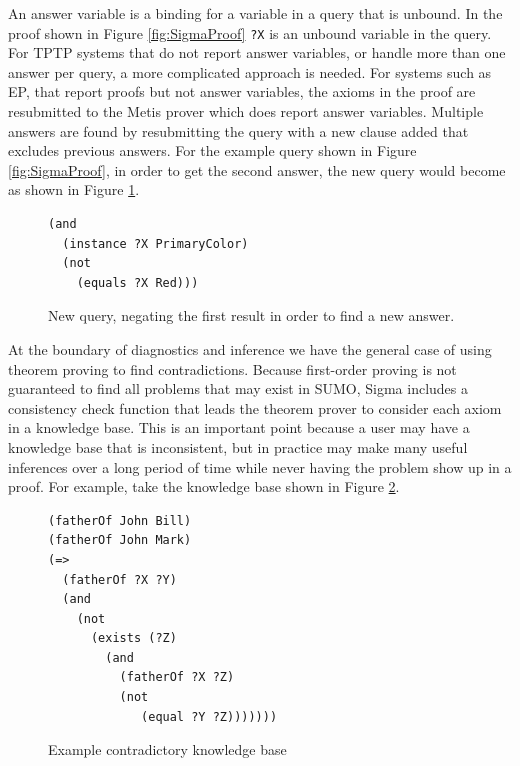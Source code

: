 \documentclass{book}
\begin{document}
An answer variable is a binding for a variable in a query that is unbound. In
the proof shown in Figure \ref{fig:SigmaProof} {\tt ?X} is an unbound variable
in the query. For TPTP systems that do not report answer variables, or handle
more than one answer per query, a more complicated approach is needed.  For
systems such as EP, that report proofs but not answer variables, the axioms in
the proof are resubmitted to the Metis prover
\cite{hurd2003firstorder} which does report answer variables.  Multiple answers
are found by resubmitting the query with a new clause added that excludes
previous answers.  For the example query shown in Figure \ref{fig:SigmaProof},
in order to get the second answer, the new query would become as shown in Figure
\ref{fig:NegQuery}.

\begin{figure}
\begin{framed}
\label{fig:NegQuery}
\begin{verbatim}
(and 
  (instance ?X PrimaryColor)
  (not
    (equals ?X Red)))
\end{verbatim}
\caption{New query, negating the first result in order to find a new answer.}
\end{framed}
\end{figure}

At the boundary of diagnostics and inference we have the general case of using
theorem proving to find contradictions.  Because first-order proving is not
guaranteed to find all problems that may exist in SUMO, Sigma includes a
consistency check function that leads the theorem prover to consider each axiom
in a knowledge base. This is an important point because a user may have a
knowledge base that is inconsistent, but in practice may make many useful
inferences over a long period of time while never having the problem show up in
a proof. For example, take the knowledge base shown in Figure \ref{fig:ContKB}.

\begin{figure}
\begin{framed}
\label{fig:ContKB}
\begin{verbatim}
(fatherOf John Bill)
(fatherOf John Mark)
(=>
  (fatherOf ?X ?Y)
  (and 
    (not  
      (exists (?Z)
        (and
          (fatherOf ?X ?Z)
          (not 
             (equal ?Y ?Z)))))))
\end{verbatim}
\caption{Example contradictory knowledge base}
\end{framed}
\end{figure}
\end{document}
